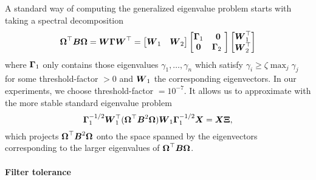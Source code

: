 A standard way of computing the generalized eigenvalue problem 
starts with taking a spectral decomposition
\begin{equation}
    \boldsymbol{\Omega}^{\top} \boldsymbol{B} \boldsymbol{\Omega}
    = \boldsymbol{W} \boldsymbol{\Gamma} \boldsymbol{W}^{\top}
    = \begin{bmatrix} \boldsymbol{W}_1 & \boldsymbol{W}_2 \end{bmatrix} 
    \begin{bmatrix} \boldsymbol{\Gamma}_1 & \boldsymbol{0} \\ \boldsymbol{0} & \boldsymbol{\Gamma}_2 \ \end{bmatrix} 
    \begin{bmatrix} \boldsymbol{W}_1^{\top} \\ \boldsymbol{W}_2^{\top} \end{bmatrix}
\end{equation}
where $\boldsymbol{\Gamma}_1$ only contains those eigenvalues $\gamma_1, \dots, \gamma_n$
which satisfy $\gamma_i \geq \zeta \max_{j} \gamma_j$ 
for some \gls{threshold-factor} $>0$ and $\boldsymbol{W}_1$ the corresponding
eigenvectors. In our experiments, we choose \gls{threshold-factor} $=10^{-7}$.
It allows us to approximate 
with the more stable standard eigenvalue problem
\begin{equation}
    \boldsymbol{\Gamma}_1^{-1/2} \boldsymbol{W}_1^{\top} (\boldsymbol{\Omega}^{\top} \boldsymbol{B}^2 \boldsymbol{\Omega}) \boldsymbol{W}_1 \boldsymbol{\Gamma}_1^{-1/2} \boldsymbol{X} = \boldsymbol{X} \boldsymbol{\Xi},
    \label{equ:3-nystrom-converted-generalized-eigenvalue-problem}
\end{equation}
which projects $\boldsymbol{\Omega}^{\top} \boldsymbol{B}^2 \boldsymbol{\Omega}$ onto the space spanned
by the eigenvectors corresponding to the larger eigenvalues of
$\boldsymbol{\Omega}^{\top} \boldsymbol{B} \boldsymbol{\Omega}$.\\

\paragraph{Filter tolerance}

